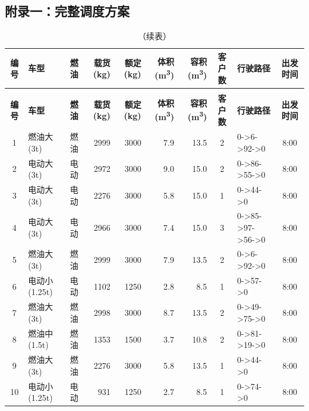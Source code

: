 
\begin{landscape}
\section{附录一：完整调度方案}   %
\scriptsize
\setlength{\tabcolsep}{3pt}
\begin{longtable}{|c|l|c|r|r|r|r|c|p{2.8cm}|c|}
\caption{问题一完整调度方案（基本信息，共163辆次）} \\
\hline
\rowcolor{gray!25}
\textbf{编号} & \textbf{车型} & \textbf{燃油} & \textbf{载货(kg)} & \textbf{额定(kg)} & \textbf{体积(m\textsuperscript{3})} & \textbf{容积(m\textsuperscript{3})} & \textbf{客户数} & \textbf{行驶路径} & \textbf{出发时间} \\
\hline
\endfirsthead
\caption[]{（续表）} \\
\hline
\rowcolor{gray!25}
\textbf{编号} & \textbf{车型} & \textbf{燃油} & \textbf{载货(kg)} & \textbf{额定(kg)} & \textbf{体积(m\textsuperscript{3})} & \textbf{容积(m\textsuperscript{3})} & \textbf{客户数} & \textbf{行驶路径} & \textbf{出发时间} \\
\hline
\endhead
\hline \endfoot
\hline \endlastfoot
\rowcolor{gray!8}
1 & 燃油大(3t) & 燃油 & 2999 & 3000 & 7.9 & 13.5 & 2 & 0->6->92->0 & 8:00 \\
\hline
2 & 电动大(3t) & 电动 & 2972 & 3000 & 9.0 & 15.0 & 2 & 0->86->55->0 & 8:00 \\
\hline
\rowcolor{gray!8}
3 & 电动大(3t) & 电动 & 2276 & 3000 & 5.8 & 15.0 & 1 & 0->44->0 & 8:00 \\
\hline
4 & 电动大(3t) & 电动 & 2966 & 3000 & 7.4 & 15.0 & 3 & 0->85->97->56->0 & 8:00 \\
\hline
\rowcolor{gray!8}
5 & 燃油大(3t) & 燃油 & 2999 & 3000 & 7.9 & 13.5 & 2 & 0->6->92->0 & 8:00 \\
\hline
6 & 电动小(1.25t) & 电动 & 1102 & 1250 & 2.8 & 8.5 & 1 & 0->57->0 & 8:00 \\
\hline
\rowcolor{gray!8}
7 & 燃油大(3t) & 燃油 & 2998 & 3000 & 8.7 & 13.5 & 2 & 0->49->75->0 & 8:00 \\
\hline
8 & 燃油中(1.5t) & 燃油 & 1353 & 1500 & 3.7 & 10.8 & 2 & 0->81->19->0 & 8:00 \\
\hline
\rowcolor{gray!8}
9 & 燃油大(3t) & 燃油 & 2276 & 3000 & 5.8 & 13.5 & 1 & 0->44->0 & 8:00 \\
\hline
10 & 电动小(1.25t) & 电动 & 931 & 1250 & 2.7 & 8.5 & 1 & 0->74->0 & 8:00 \\

\end{longtable}
\end{landscape}
